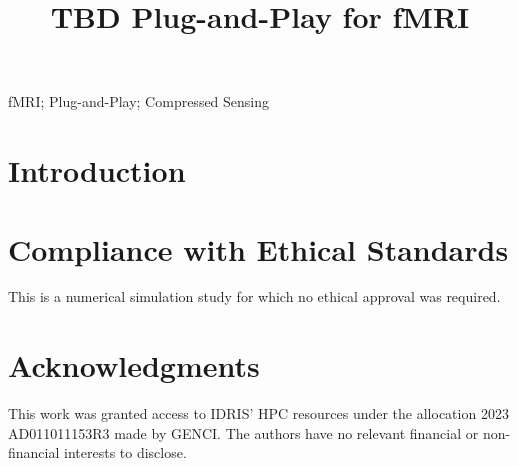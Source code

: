 \documentclass{article}
\title{TBD  Plug-and-Play for fMRI}
\begin{document}
\ninept
\maketitle

\begin{abstract}
\end{abstract}
\begin{keywords}
fMRI; Plug-and-Play; Compressed Sensing
\end{keywords}

\section{Introduction}

\section{Compliance with Ethical Standards}
This is a numerical simulation study for which no ethical approval was required.
\section{Acknowledgments}
This work was granted access to IDRIS' HPC resources under the allocation 2023 AD011011153R3 made by GENCI. The authors have no relevant financial or non-financial interests to disclose.
\printbibliography
\end{document}
